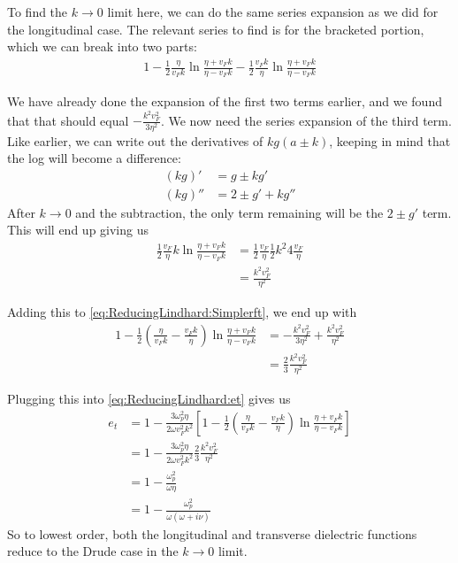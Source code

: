 \documentclass[../../main.tex]{subfiles}
\newcommand{\vf}{v_F}
\begin{document}
To find the $k \rightarrow 0$ limit here, we can do the same series expansion as we did for the longitudinal case. The relevant series to find is for the bracketed portion, which we can break into two parts:
\begin{align} \label{eq:ReducingLindhard:Simplerft}
	 1 - \frac12 \frac{\eta}{\vf k}\ln\frac{\eta + \vf k}{\eta - \vf k} - \frac12 \frac{\vf k}{\eta}\ln\frac{\eta + \vf k}{\eta - \vf k}
\end{align}

We have already done the expansion of the first two terms earlier, and we found that that should equal $- \frac{k^2 \vf^2}{3 \eta^2}$. We now need the series expansion of the third term. Like earlier, we can write out the derivatives of $k g(a \pm k)$, keeping in mind that the log will become a difference:
\begin{align}
	(k g)' &= g \pm k g' \\
	(k g)'' &= 2\pm g' + k g''
\end{align}
After $k \rightarrow 0$ and the subtraction, the only term remaining will be the $2 \pm g'$ term. This will end up giving us
\begin{align}
	\frac12 \frac{\vf }{\eta} k \ln\frac{\eta + \vf k}{\eta - \vf k} &= \frac12 \frac{\vf}{\eta} \frac12 k^2 4  \frac{\vf}{\eta} \\
	&= \frac{k^2 \vf^2}{\eta^2} 
\end{align}

Adding this to \eqref{eq:ReducingLindhard:Simplerft}, we end up with 
\begin{align}
	1 - \frac12 \left(\frac{\eta}{\vf k} - \frac{\vf k}{\eta} \right)\ln\frac{\eta + \vf k}{\eta - \vf k} &= - \frac{k^2 \vf^2}{3 \eta^2} + \frac{k^2 \vf^2}{\eta^2} \\
	&= \frac23 \frac{k^2 \vf^2}{\eta^2}
\end{align}

Plugging this into \eqref{eq:ReducingLindhard:et} gives us
\begin{align}
	e_t &= 1 - \frac{3 \omega_p^2 \eta}{2\omega \vf^2 k^2} \left[ 1 - \frac12 \left(\frac{\eta}{\vf k} - \frac{\vf k}{\eta} \right)\ln\frac{\eta + \vf k}{\eta - \vf k} \right] \\
	&= 1 - \frac{3 \omega_p^2 \eta}{2\omega \vf^2 k^2} \frac23 \frac{k^2 \vf^2}{\eta^2} \\
	&= 1 - \frac{\omega_p^2}{\omega \eta}\\
	&= 1 - \frac{\omega_p^2}{\omega \left(\omega + i \nu \right) }
\end{align}
So to lowest order, both the longitudinal and transverse dielectric functions reduce to the Drude case in the $k \rightarrow 0$ limit.
\end{document}
